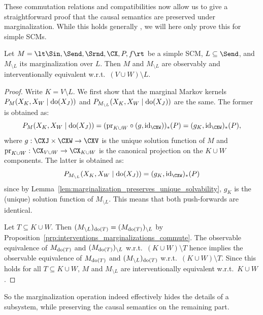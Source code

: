 These commutation relations and compatibilities now allow us to give a straightforward proof that
the causal semantics are preserved under marginalization.
While this holds generally \cite{BFPM21}, we will here only prove this for simple SCMs.
\begin{Thm}\label{thm:various_equiv_marginalization}
  Let $M = \lt \Sin, \Send, \Srnd, \CX, P, f \rt$ be a simple SCM, $L \subseteq \Send$, and
  $M_{\setminus L}$ its marginalization over $L$. Then $M$ and $M_{\setminus L}$ are observably
  and interventionally equivalent w.r.t.\ $(V \cup W) \setminus L$.
\end{Thm}
\begin{proof}
  Write $K = V \setminus L$.
  We first show that the marginal Markov kernels $P_{M}(X_K,X_W \mid \operatorname{do}(X_J))$ and $P_{M_{\setminus L}}(X_K,X_W \mid \operatorname{do}(X_J))$ are the same.
  The former is obtained as:
  $$P_{M}(X_K,X_W \mid \doit(X_J)) = (\pr_{K\cup W} \circ (g,\id_{\CXW}))_*(P) = (g_{K},\id_{\CXW})_*(P),$$
  where $g : \CXJ \times \CXW \to \CXV$ is the unique solution function of $M$ and
  $\pr_{K\cup W} : \CX_{V \cup W} \to \CX_{K\cup W}$ is the canonical projection on the $K\cup W$ components. 
  The latter is obtained as:
  $$P_{M_{\setminus L}}(X_K,X_W \mid \doit(X_J)) = (g_K,\id_{\CXW})_*(P)$$
  since by Lemma~\ref{lem:marginalization_preserves_unique_solvability}, $g_K$ is the (unique) solution function of $M_{\setminus L}$.
  This means that both push-forwards are identical.

  Let $T \subseteq K \cup W$. Then $(M_{\setminus L})_{\operatorname{do}(T)} = (M_{\operatorname{do}(T)})_{\setminus L}$ by
  Proposition~\ref{prp:interventions_marginalizations_commute}. 
  The observable equivalence of $M_{\operatorname{do}(T)}$ and $(M_{\operatorname{do}(T)})_{\setminus L}$ w.r.t.\ $(K \cup W) \setminus T$ hence implies the observable equivalence of $M_{\operatorname{do}(T)}$ and $(M_{\setminus L})_{\operatorname{do}(T)}$ w.r.t.\ $(K \cup W) \setminus T$. 
  Since this holds for all $T \subseteq K \cup W$, $M$ and $M_{\setminus L}$ are interventionally equivalent w.r.t.\ $K \cup W$.
\end{proof}
So the marginalization operation indeed effectively hides the details of a subsystem, while preserving the causal semantics on the remaining part.
